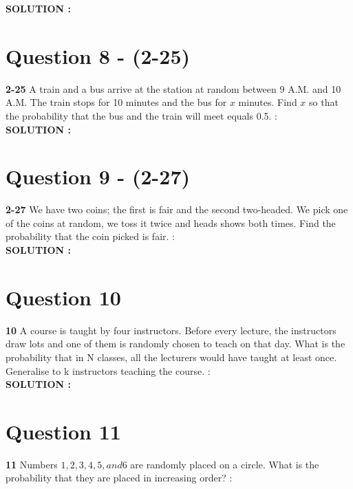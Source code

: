 \documentclass{article}
\begin{document}
\hspace{1em} \large{\textbf{SOLUTION :}} \\

\section{Question 8 - (2-25)}
\label{Q8}
\textbf{2-25} A train and a bus arrive at the station at random between 9 A.M. and 10 A.M. The train stops for 10 minutes and the bus for $x$ minutes. Find $x$ so that the probability that the bus and the train will meet equals 0.5. : \\

\hspace{1em} \large{\textbf{SOLUTION :}} \\

\section{Question 9 - (2-27)}
\label{Q9}
\textbf{2-27} We have two coins; the first is fair and the second two-headed. We pick one of the coins at random, we toss it twice and heads shows both times. Find the probability that the coin picked is fair.  : \\

\hspace{1em} \large{\textbf{SOLUTION :}} \\

\section{Question 10}
\label{Q10}
\textbf{10} A course is taught by four instructors. Before every lecture, the instructors draw lots and one of them is randomly chosen to teach on that day. What is the probability that in N classes, all the lecturers would have taught at least once. Generalise to k instructors teaching the course. : \\

\hspace{1em} \large{\textbf{SOLUTION :}} \\

\section{Question 11}
\label{Q11}
\textbf{11} Numbers $1, 2, 3, 4, 5, and 6$ are randomly placed on a circle. What is the probability that they are placed in increasing order?  : \\
\end{document}
